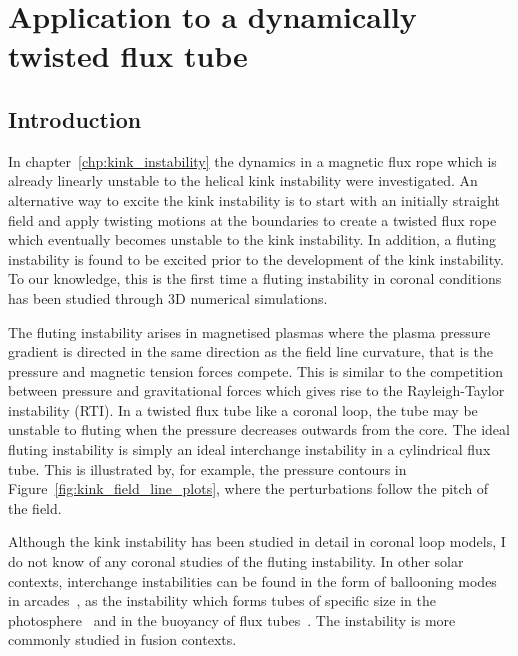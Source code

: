 \chapter{Application to a dynamically twisted flux tube}

\label{chp:kink_instability_straight}

\graphicspath{{images/kink_instability_straight/}}

\section{Introduction}

In chapter~\ref{chp:kink_instability} the dynamics in a magnetic flux rope which is already linearly unstable to the helical kink instability were investigated. An alternative way to excite the kink instability is to start with an initially straight field and apply twisting motions at the boundaries to create a twisted flux rope which eventually becomes unstable to the kink instability. In addition, a fluting instability is found to be excited prior to the development of the kink instability. To our knowledge, this is the first time a fluting instability in coronal conditions has been studied through 3D numerical simulations. 

The fluting instability arises in magnetised plasmas where the plasma pressure gradient is directed in the same direction as the field line curvature, that is the pressure and magnetic tension forces compete. This is similar to the competition between pressure and gravitational forces which gives rise to the Rayleigh-Taylor instability (RTI). In a twisted flux tube like a coronal loop, the tube may be unstable to fluting when the pressure decreases outwards from the core. The ideal fluting instability is simply an ideal interchange instability in a cylindrical flux tube. This is illustrated by, for example, the pressure contours in Figure~\ref{fig:kink_field_line_plots}, where the perturbations follow the pitch of the field.

Although the kink instability has been studied in detail in coronal loop models, I do not know of any coronal studies of the fluting instability. In other solar contexts, interchange instabilities can be found in the form of ballooning modes in arcades~\cite{hoodBallooningInstabilitiesSolar1986}, as the instability which forms tubes of specific size in the photosphere~\cite{bunteInterchangeInstabilitySolar1993} and in the buoyancy of flux tubes~\cite{schuesslerInterchangeInstabilitySmall1984}. The instability is more commonly studied in fusion contexts.

